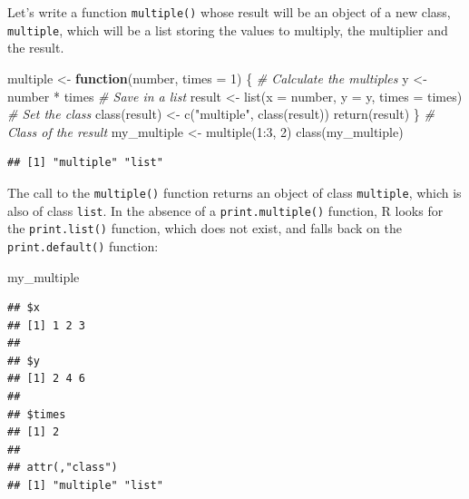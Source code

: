 \documentclass[
  12pt,
  american,
  a4paper,
  extrafontsizes,onecolumn,openright
  ]{memoir}
\newenvironment{Shaded}{\begin{snugshade}}{\end{snugshade}}
\newcommand{\AttributeTok}[1]{\textcolor[rgb]{0.77,0.63,0.00}{#1}}
\newcommand{\CommentTok}[1]{\textcolor[rgb]{0.56,0.35,0.01}{\textit{#1}}}
\newcommand{\ControlFlowTok}[1]{\textcolor[rgb]{0.13,0.29,0.53}{\textbf{#1}}}
\newcommand{\DecValTok}[1]{\textcolor[rgb]{0.00,0.00,0.81}{#1}}
\newcommand{\FunctionTok}[1]{\textcolor[rgb]{0.00,0.00,0.00}{#1}}
\newcommand{\NormalTok}[1]{#1}
\newcommand{\OtherTok}[1]{\textcolor[rgb]{0.56,0.35,0.01}{#1}}
\newcommand{\SpecialCharTok}[1]{\textcolor[rgb]{0.00,0.00,0.00}{#1}}
\newcommand{\StringTok}[1]{\textcolor[rgb]{0.31,0.60,0.02}{#1}}
\begin{document}
Let's write a function \texttt{multiple()} whose result will be an object of a new class, \texttt{multiple}, which will be a list storing the values to multiply, the multiplier and the result.

\scriptsize

\begin{Shaded}
\begin{Highlighting}[]
\NormalTok{multiple }\OtherTok{\textless{}{-}} \ControlFlowTok{function}\NormalTok{(number, }\AttributeTok{times =} \DecValTok{1}\NormalTok{) \{}
    \CommentTok{\# Calculate the multiples}
\NormalTok{    y }\OtherTok{\textless{}{-}}\NormalTok{ number }\SpecialCharTok{*}\NormalTok{ times}
    \CommentTok{\# Save in a list}
\NormalTok{    result }\OtherTok{\textless{}{-}} \FunctionTok{list}\NormalTok{(}\AttributeTok{x =}\NormalTok{ number, }\AttributeTok{y =}\NormalTok{ y, }\AttributeTok{times =}\NormalTok{ times)}
    \CommentTok{\# Set the class}
    \FunctionTok{class}\NormalTok{(result) }\OtherTok{\textless{}{-}} \FunctionTok{c}\NormalTok{(}\StringTok{"multiple"}\NormalTok{, }\FunctionTok{class}\NormalTok{(result))}
    \FunctionTok{return}\NormalTok{(result)}
\NormalTok{\}}
\CommentTok{\# Class of the result}
\NormalTok{my\_multiple }\OtherTok{\textless{}{-}} \FunctionTok{multiple}\NormalTok{(}\DecValTok{1}\SpecialCharTok{:}\DecValTok{3}\NormalTok{, }\DecValTok{2}\NormalTok{)}
\FunctionTok{class}\NormalTok{(my\_multiple)}
\end{Highlighting}
\end{Shaded}

\begin{verbatim}
## [1] "multiple" "list"
\end{verbatim}

\normalsize

The call to the \texttt{multiple()} function returns an object of class \texttt{multiple}, which is also of class \texttt{list}.
In the absence of a \texttt{print.multiple()} function, R looks for the \texttt{print.list()} function, which does not exist, and falls back on the \texttt{print.default()} function:

\scriptsize

\begin{Shaded}
\begin{Highlighting}[]
\NormalTok{my\_multiple}
\end{Highlighting}
\end{Shaded}

\begin{verbatim}
## $x
## [1] 1 2 3
## 
## $y
## [1] 2 4 6
## 
## $times
## [1] 2
## 
## attr(,"class")
## [1] "multiple" "list"
\end{verbatim}
\end{document}
